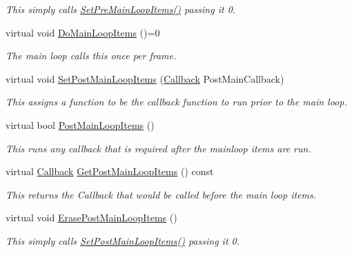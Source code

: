 \begin{DoxyCompactItemize}
\begin{DoxyCompactList}\small\item\em This simply calls \hyperlink{classphys_1_1ManagerBase_a3fcf207a451d0047f884babadd0bc53e}{SetPreMainLoopItems()} passing it 0. \item\end{DoxyCompactList}\item 
virtual void \hyperlink{classphys_1_1ManagerBase_aa9e13a3f7c398b708f0f242610b5abf7}{DoMainLoopItems} ()=0
\begin{DoxyCompactList}\small\item\em The main loop calls this once per frame. \item\end{DoxyCompactList}\item 
virtual void \hyperlink{classphys_1_1ManagerBase_a673b3adef73c467f4d90514a5133bf7c}{SetPostMainLoopItems} (\hyperlink{classphys_1_1ManagerBase_a753f5f0127131529767beab2502f480b}{Callback} PostMainCallback)
\begin{DoxyCompactList}\small\item\em This assigns a function to be the callback function to run prior to the main loop. \item\end{DoxyCompactList}\item 
virtual bool \hyperlink{classphys_1_1ManagerBase_afc3572602f96bdeb8215c386ff870820}{PostMainLoopItems} ()
\begin{DoxyCompactList}\small\item\em This runs any callback that is required after the mainloop items are run. \item\end{DoxyCompactList}\item 
virtual \hyperlink{classphys_1_1ManagerBase_a753f5f0127131529767beab2502f480b}{Callback} \hyperlink{classphys_1_1ManagerBase_a1e541b261e5747ebcfcefdd3dcff78ce}{GetPostMainLoopItems} () const 
\begin{DoxyCompactList}\small\item\em This returns the Callback that would be called before the main loop items. \item\end{DoxyCompactList}\item 
\hypertarget{classphys_1_1ManagerBase_a9306dafe9ffe52916b84cf157fbc12d8}{
virtual void \hyperlink{classphys_1_1ManagerBase_a9306dafe9ffe52916b84cf157fbc12d8}{ErasePostMainLoopItems} ()}
\label{d2/de3/classphys_1_1ManagerBase_a9306dafe9ffe52916b84cf157fbc12d8}

\begin{DoxyCompactList}\small\item\em This simply calls \hyperlink{classphys_1_1ManagerBase_a673b3adef73c467f4d90514a5133bf7c}{SetPostMainLoopItems()} passing it 0. \item\end{DoxyCompactList}\end{DoxyCompactItemize}
